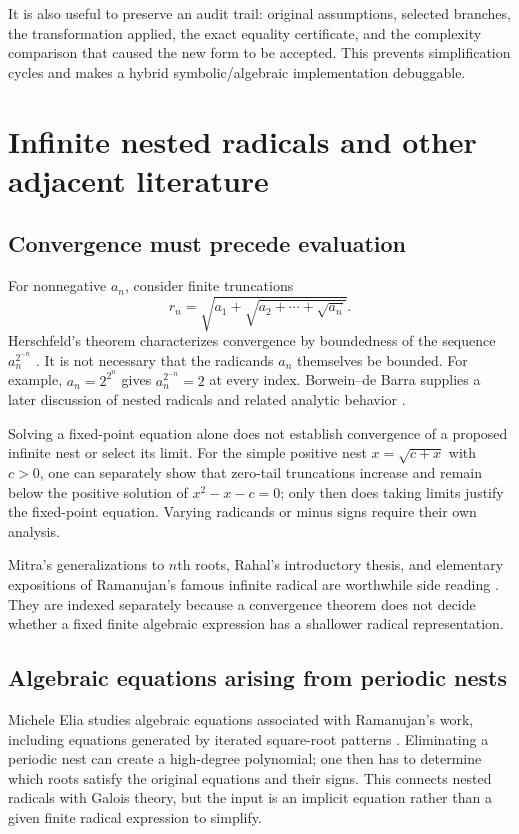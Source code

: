 \documentclass[11pt,a4paper]{article}
\numberwithin{equation}{section}
\theoremstyle{definition}\newtheorem{definition}[theorem]{Definition}
\theoremstyle{remark}\newtheorem{remark}[theorem]{Remark}
\begin{document}
It is also useful to preserve an audit trail: original assumptions, selected branches, the transformation applied, the exact equality certificate, and the complexity comparison that caused the new form to be accepted. This prevents simplification cycles and makes a hybrid symbolic/algebraic implementation debuggable.

\section{Infinite nested radicals and other adjacent literature}
\label{sec:infinite}

\subsection{Convergence must precede evaluation}
For nonnegative $a_n$, consider finite truncations
\[
r_n=\sqrt{a_1+\sqrt{a_2+\cdots+\sqrt{a_n}}}.
\]
Herschfeld's theorem characterizes convergence by boundedness of the sequence $a_n^{2^{-n}}$ \cite{herschfeld}. It is not necessary that the radicands $a_n$ themselves be bounded. For example, $a_n=2^{2^n}$ gives $a_n^{2^{-n}}=2$ at every index. Borwein--de Barra supplies a later discussion of nested radicals and related analytic behavior \cite{borwein}.

Solving a fixed-point equation alone does not establish convergence of a proposed infinite nest or select its limit. For the simple positive nest $x=\sqrt{c+x}$ with $c>0$, one can separately show that zero-tail truncations increase and remain below the positive solution of $x^2-x-c=0$; only then does taking limits justify the fixed-point equation. Varying radicands or minus signs require their own analysis.

Mitra's generalizations to $n$th roots, Rahal's introductory thesis, and elementary expositions of Ramanujan's famous infinite radical are worthwhile side reading \cite{mitra,rahal,infiniteblogs}. They are indexed separately because a convergence theorem does not decide whether a fixed finite algebraic expression has a shallower radical representation.

\subsection{Algebraic equations arising from periodic nests}
Michele Elia studies algebraic equations associated with Ramanujan's work, including equations generated by iterated square-root patterns \cite{elia}. Eliminating a periodic nest can create a high-degree polynomial; one then has to determine which roots satisfy the original equations and their signs. This connects nested radicals with Galois theory, but the input is an implicit equation rather than a given finite radical expression to simplify.
\end{document}
